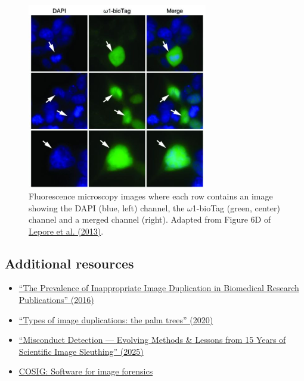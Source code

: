 \documentclass[letterpaper, 12pt]{article}
\begin{document}
\begin{figure}[h!tbp]
    \centering
    \includegraphics[width=0.7\textwidth]{img/image_duplication/merge.JPG}
    \caption*{Fluorescence microscopy images where each row contains an image showing the DAPI (blue, left) channel, the $\omega$1-bioTag (green, center) channel and a merged channel (right). Adapted from Figure 6D of \href{https://doi.org/10.1371/journal.pone.0083018}{Lepore et al. (2013)}.}
\end{figure}


\subsection*{Additional resources}

\begin{itemize}
    \setlength\itemsep{-0.5em}
    \item \href{https://doi.org/10.1128/mbio.00809-16}{``The Prevalence of Inappropriate Image Duplication in Biomedical Research Publications'' (2016)}
    \item \href{https://scienceintegritydigest.com/2020/01/08/types-of-image-duplications/}{``Types of image duplications: the palm trees'' (2020)}
    \item \href{https://doi.org/10.1017/jme.2025.32}{``Misconduct Detection — Evolving Methods \& Lessons from 15 Years of Scientific Image Sleuthing'' (2025)}
    \item \href{https://osf.io/g23pf}{COSIG: Software for image forensics}
\end{itemize}
\end{document}
